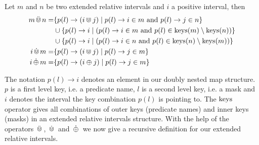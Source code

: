 \begin{definition}
    \label{def:e-rel-int-ops}
    Let $m$ and $n$ be two extended relative intervals and $i$ a positive interval, then 
    \begin{align*}
        m \,\ddot{\Cup}\, n = 
            & \{ p(l) \rightarrow (i \Cup j) \mid 
                p(l) \rightarrow i \in m \text{ and } 
                p(l) \rightarrow j \in n \} \\
            & \cup \{p(l) \rightarrow i \mid  
                (p(l) \rightarrow i \in m \text{ and }
                p(l) \in \operatorname{keys}(m) \setminus \operatorname{keys}(n)) \} \\
            & \cup \{p(l) \rightarrow i \mid  
                (p(l) \rightarrow i \in n \text{ and }
                p(l) \in \operatorname{keys}(n) \setminus \operatorname{keys}(m))
                \}        
                \\
        i \,\dot{\Cup}\, m = 
            & \{ p(l) \rightarrow (i \Cup j) \mid 
                p(l) \rightarrow j \in m \} \\
        i \,\dot{\oplus}\, m = 
            & \{ p(l) \rightarrow (i \oplus j) \mid 
                p(l) \rightarrow j \in m \} \\
    \end{align*}
\end{definition}

The notation $p(l) \rightarrow i$ denotes an element in our doubly nested map structure.
$p$ is a first level key, i.e. a predicate name, $l$ is a second level key, i.e. a mask and $i$ denotes the interval the key combination $p(l)$ is pointing to.
The $\operatorname{keys}$ operator gives all combinations of outer keys (predicate names) and inner keys (masks) in an extended relative intervals structure.
With the help of the operators $\,\ddot{\Cup}\,$, $\,\dot{\Cup}\,$ and $\,\dot{\oplus}\,$ we now give a recursive definition for our extended relative intervals.


